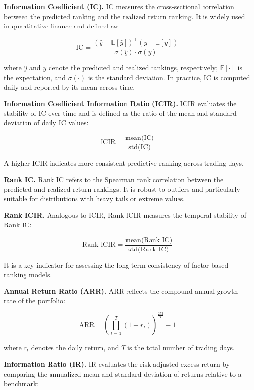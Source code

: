 \documentclass{article}
\begin{document}
\textbf{Information Coefficient (IC).}
IC measures the cross-sectional correlation between the predicted ranking and the realized return ranking. It is widely used in quantitative finance and defined as:

\begin{equation}
\text{IC} = \frac{( \hat{y} - \mathbb{E}[\hat{y}] )^\top (y - \mathbb{E}[y])}{\sigma(\hat{y}) \cdot \sigma(y)}
\end{equation}

where $\hat{y}$ and $y$ denote the predicted and realized rankings, respectively; $\mathbb{E}[\cdot]$ is the expectation, and $\sigma(\cdot)$ is the standard deviation. In practice, IC is computed daily and reported by its mean across time.

\textbf{Information Coefficient Information Ratio (ICIR).}
ICIR evaluates the stability of IC over time and is defined as the ratio of the mean and standard deviation of daily IC values:

\begin{equation}
\text{ICIR} = \frac{\text{mean(IC)}}{\text{std(IC)}}
\end{equation}

A higher ICIR indicates more consistent predictive ranking across trading days.

\textbf{Rank IC.}
Rank IC refers to the Spearman rank correlation between the predicted and realized return rankings. It is robust to outliers and particularly suitable for distributions with heavy tails or extreme values.

\textbf{Rank ICIR.}
Analogous to ICIR, Rank ICIR measures the temporal stability of Rank IC:

\begin{equation}
\text{Rank ICIR} = \frac{\text{mean(Rank IC)}}{\text{std(Rank IC)}}
\end{equation}

It is a key indicator for assessing the long-term consistency of factor-based ranking models.

\textbf{Annual Return Ratio (ARR).}
ARR reflects the compound annual growth rate of the portfolio:

\begin{equation}
\text{ARR} = \left( \prod_{t=1}^{T} (1 + r_t) \right)^{\frac{252}{T}} - 1
\end{equation}

where $r_t$ denotes the daily return, and $T$ is the total number of trading days.

\textbf{Information Ratio (IR).}
IR evaluates the risk-adjusted excess return by comparing the annualized mean and standard deviation of returns relative to a benchmark:
\end{document}
